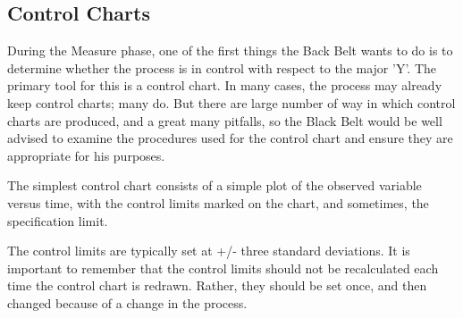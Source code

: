 \subsection{Control Charts}

During the Measure phase, one of the first things the Back Belt wants to do is to determine whether the
process is in control with respect to the major 'Y'. The primary tool for this is a control chart. In many
cases, the process may already keep control charts; many do. But there are large number of way in which
control charts are produced, and a great many pitfalls, so the Black Belt would be well advised to examine
the procedures used for the control chart and ensure they are appropriate for his purposes.

The simplest control chart consists of a simple plot of the observed variable versus time, with the control
limits marked on the chart, and sometimes, the specification limit.

The control limits are typically set at +/- three standard deviations. It is important to remember that the
control limits should not be recalculated each time the control chart is redrawn. Rather, they should be set
once, and then changed because of a change in the process.

